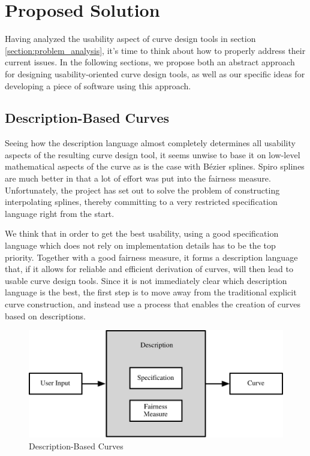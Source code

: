 \documentclass[a4paper]{article}
\begin{document}
	\section{Proposed Solution}
	\label{section:proposed_solution}

		Having analyzed the usability aspect of curve design tools in section \ref{section:problem_analysis}, it's time to think about how to properly address their current issues. In the following sections, we propose both an abstract approach for designing usability-oriented curve design tools, as well as our specific ideas for developing a piece of software using this approach.
          
		\subsection{Description-Based Curves}
		\label{section:description-based_curves}

			Seeing how the description language almost completely determines all usability aspects of the resulting curve design tool, it seems unwise to base it on low-level mathematical aspects of the curve as is the case with Bézier splines. Spiro splines are much better in that a lot of effort was put into the fairness measure. Unfortunately, the project has set out to solve the problem of constructing interpolating splines, thereby committing to a very restricted specification language right from the start.

			We think that in order to get the best usability, using a good specification language which does not rely on implementation details has to be the top priority. Together with a good fairness measure, it forms a description language that, if it allows for reliable and efficient derivation of curves, will then lead to usable curve design tools. Since it is not immediately clear which description language is the best, the first step is to move away from the traditional explicit curve construction, and instead use a process that enables the creation of curves based on descriptions.

			\begin{figure}[htbp]
				\centering
				\includegraphics[width=\textwidth]{content/output/description-based_curves.pdf}
				\caption{Description-Based Curves}
				\label{figure:description-based_curves}
			\end{figure}
\end{document}
